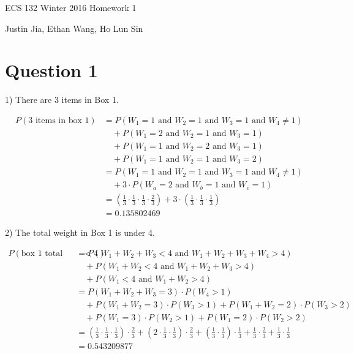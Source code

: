 \documentclass[11pt]{article}
\begin{document}
ECS 132 Winter 2016 Homework 1

Justin Jia, Ethan Wang, Ho Lun Sin

\section{Question 1}

1) There are 3 items in Box 1.

\begin{align*}
P(\text{3 items in box 1}) &= P(W_1 = 1 \text{ and } W_2 = 1 \text{ and } W_3 = 1 \text{ and } W_4 \neq 1)\\
                              &\quad + P(W_1 = 2 \text{ and } W_2 = 1 \text{ and } W_3 = 1)\\
                              &\quad + P(W_1 = 1 \text{ and } W_2 = 2 \text{ and } W_3 = 1)\\
                              &\quad + P(W_1 = 1 \text{ and } W_2 = 1 \text{ and } W_3 = 2)\\
                           &= P(W_1 = 1 \text{ and } W_2 = 1 \text{ and } W_3 = 1 \text{ and } W_4 \neq 1)\\
                              &\quad + 3 \cdot P(W_a = 2 \text{ and } W_b = 1 \text{ and } W_c = 1)\\
                           &= (\frac13 \cdot \frac13 \cdot \frac13 \cdot \frac23) + 3 \cdot (\frac13 \cdot \frac13 \cdot \frac13)\\
                           &= 0.135802469
\end{align*}

2) The total weight in Box 1 is under 4.

\begin{align*}
P(\text{box 1 total weight} < 4) &= P(W_1 + W_2 + W_3 < 4 \text{ and } W_1 + W_2 + W_3 + W_4 > 4)\\
                                    &\quad + P(W_1 + W_2 < 4 \text{ and } W_1 + W_2 + W_3 > 4)\\
                                    &\quad + P(W_1 < 4 \text{ and } W_1 + W_2 > 4)\\
                                 &= P(W_1 + W_2 + W_3 = 3) \cdot P(W_4 > 1)\\
                                    &\quad + P(W_1 + W_2 = 3) \cdot P(W_3 > 1) + P(W_1 + W_2 = 2) \cdot P(W_3 > 2)\\
                                    &\quad + P(W_1 = 3) \cdot P(W_2 > 1) + P(W_1 = 2) \cdot P(W_2 > 2)\\
                                 &= (\frac13 \cdot \frac13 \cdot \frac13) \cdot \frac23 + (2 \cdot \frac13 \cdot \frac13) \cdot \frac23 + (\frac13 \cdot \frac13) \cdot \frac13 + \frac13 \cdot \frac23 + \frac13 \cdot \frac13\\
                                 &= 0.543209877
\end{align*}
\end{document}

